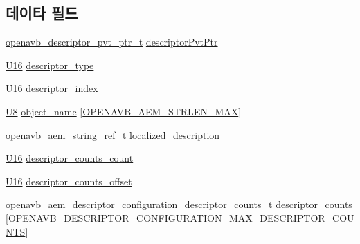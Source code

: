 \subsection*{데이타 필드}
\begin{DoxyCompactItemize}
\item 
\hyperlink{openavb__aem__pub_8h_a85eabab4b7d2466e94c1c3b43b11371d}{openavb\+\_\+descriptor\+\_\+pvt\+\_\+ptr\+\_\+t} \hyperlink{structopenavb__aem__descriptor__configuration__t_a302e92fd6cf4d398d5305395359fb157}{descriptor\+Pvt\+Ptr}
\item 
\hyperlink{openavb__types__base__pub_8h_a0a0a322d5fa4a546d293a77ba8b4a71f}{U16} \hyperlink{structopenavb__aem__descriptor__configuration__t_a1e231d7874aada5925b29affc76782cc}{descriptor\+\_\+type}
\item 
\hyperlink{openavb__types__base__pub_8h_a0a0a322d5fa4a546d293a77ba8b4a71f}{U16} \hyperlink{structopenavb__aem__descriptor__configuration__t_ab26fb363c24b9a2a4391f9171c981b08}{descriptor\+\_\+index}
\item 
\hyperlink{openavb__types__base__pub_8h_aa63ef7b996d5487ce35a5a66601f3e73}{U8} \hyperlink{structopenavb__aem__descriptor__configuration__t_a5e98aba8105a7a6d82fac41816c83da3}{object\+\_\+name} \mbox{[}\hyperlink{openavb__aem__types__pub_8h_ab2bb82e9f856a76b8305e4864f23ee58}{O\+P\+E\+N\+A\+V\+B\+\_\+\+A\+E\+M\+\_\+\+S\+T\+R\+L\+E\+N\+\_\+\+M\+AX}\mbox{]}
\item 
\hyperlink{structopenavb__aem__string__ref__t}{openavb\+\_\+aem\+\_\+string\+\_\+ref\+\_\+t} \hyperlink{structopenavb__aem__descriptor__configuration__t_afd613361c59409fb6dcc0c237d1cfbfd}{localized\+\_\+description}
\item 
\hyperlink{openavb__types__base__pub_8h_a0a0a322d5fa4a546d293a77ba8b4a71f}{U16} \hyperlink{structopenavb__aem__descriptor__configuration__t_aad92a413a2e8519300e21b72f6bf9412}{descriptor\+\_\+counts\+\_\+count}
\item 
\hyperlink{openavb__types__base__pub_8h_a0a0a322d5fa4a546d293a77ba8b4a71f}{U16} \hyperlink{structopenavb__aem__descriptor__configuration__t_a79d0b0849e0a484c8e77e4141010c0e6}{descriptor\+\_\+counts\+\_\+offset}
\item 
\hyperlink{structopenavb__aem__descriptor__configuration__descriptor__counts__t}{openavb\+\_\+aem\+\_\+descriptor\+\_\+configuration\+\_\+descriptor\+\_\+counts\+\_\+t} \hyperlink{structopenavb__aem__descriptor__configuration__t_ad7db499b59066f87ab5636ff012a1fb9}{descriptor\+\_\+counts} \mbox{[}\hyperlink{openavb__descriptor__configuration__pub_8h_a62820621a61b906bd84cf7a985978e06}{O\+P\+E\+N\+A\+V\+B\+\_\+\+D\+E\+S\+C\+R\+I\+P\+T\+O\+R\+\_\+\+C\+O\+N\+F\+I\+G\+U\+R\+A\+T\+I\+O\+N\+\_\+\+M\+A\+X\+\_\+\+D\+E\+S\+C\+R\+I\+P\+T\+O\+R\+\_\+\+C\+O\+U\+N\+TS}\mbox{]}
\end{DoxyCompactItemize}


